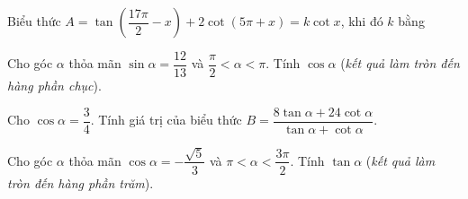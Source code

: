 
\begin{ex}%
	Biểu thức $A=\tan  \left(\dfrac{17\pi}{2}-x\right)+2\cot (5\pi+x)=k \cot x$, khi đó $k$ bằng
\end{ex}

\begin{ex}%
	Cho góc $\alpha $ thỏa mãn $\sin \alpha =\dfrac{12}{13} $ và $\dfrac{\pi }{2} <\alpha <\pi $. Tính $\cos \alpha$  (\textit{kết quả làm tròn đến hàng phần chục}).
\end{ex}

\begin{ex}%
	Cho $\cos \alpha=\dfrac{3}{4}$. Tính giá trị của biểu thức $B=\dfrac{8\tan  \alpha+24\cot \alpha}{\tan \alpha+\cot \alpha}$.
\end{ex}

\begin{ex}%
	Cho góc $\alpha $ thỏa mãn $\cos \alpha =-\dfrac{\sqrt{5} }{3} $ và $\pi  <\alpha <\dfrac{3\pi }{2} $. Tính $\tan \alpha$ (\textit{kết quả làm tròn đến hàng phần trăm}).
\end{ex}

